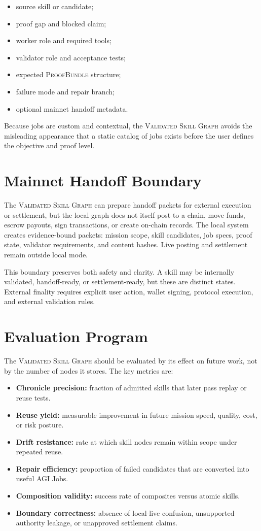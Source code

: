 \documentclass[10.5pt,oneside]{article}
\newcommand{\vsg}{\textsc{Validated Skill Graph}}
\newcommand{\proofbundle}{\textsc{ProofBundle}}
\begin{document}
\begin{itemize}
  \item source skill or candidate;
  \item proof gap and blocked claim;
  \item worker role and required tools;
  \item validator role and acceptance tests;
  \item expected \proofbundle{} structure;
  \item failure mode and repair branch;
  \item optional mainnet handoff metadata.
\end{itemize}

Because jobs are custom and contextual, the \vsg{} avoids the misleading appearance that a static catalog of jobs exists before the user defines the objective and proof level.

\section{Mainnet Handoff Boundary}
The \vsg{} can prepare handoff packets for external execution or settlement, but the local graph does not itself post to a chain, move funds, escrow payouts, sign transactions, or create on-chain records. The local system creates evidence-bound packets: mission scope, skill candidates, job specs, proof state, validator requirements, and content hashes. Live posting and settlement remain outside local mode.

This boundary preserves both safety and clarity. A skill may be internally validated, handoff-ready, or settlement-ready, but these are distinct states. External finality requires explicit user action, wallet signing, protocol execution, and external validation rules.

\section{Evaluation Program}
The \vsg{} should be evaluated by its effect on future work, not by the number of nodes it stores. The key metrics are:

\begin{itemize}
  \item \textbf{Chronicle precision:} fraction of admitted skills that later pass replay or reuse tests.
  \item \textbf{Reuse yield:} measurable improvement in future mission speed, quality, cost, or risk posture.
  \item \textbf{Drift resistance:} rate at which skill nodes remain within scope under repeated reuse.
  \item \textbf{Repair efficiency:} proportion of failed candidates that are converted into useful AGI Jobs.
  \item \textbf{Composition validity:} success rate of composites versus atomic skills.
  \item \textbf{Boundary correctness:} absence of local-live confusion, unsupported authority leakage, or unapproved settlement claims.
\end{itemize}
\end{document}
